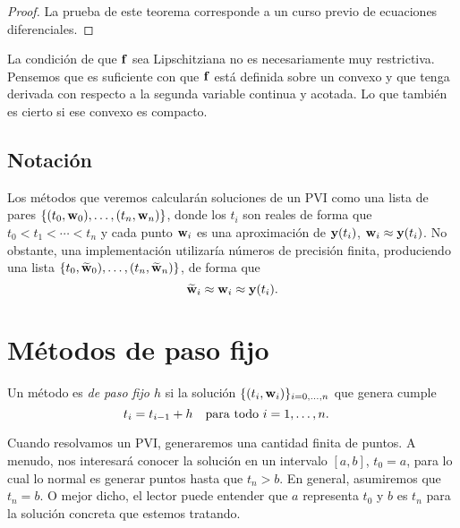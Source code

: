 \begin{proof}
    La prueba de este teorema corresponde a
    un curso previo de ecuaciones diferenciales.
\end{proof}

\begin{remark}
    La condición de que $\vb{f}$ sea Lipschitziana no es necesariamente
    muy restrictiva.
    Pensemos que es suficiente con que $\vb{f}$ está definida sobre un convexo y
    que tenga derivada con respecto a la segunda variable continua y acotada.
    Lo que también es cierto si ese convexo es compacto.
\end{remark}

\subsection{Notación}

Los métodos que veremos calcularán soluciones de un PVI
como una lista de pares $\{(t_0, \vb{w}_0), \ldots, (t_n, \vb{w}_n)\}$,
donde los $t_i$ son reales de forma que $t_0 < t_1 < \cdots < t_n$
y cada punto $\vb{w}_i$ es una aproximación de $\vb{y}(t_i)$,
$\vb{w}_i \approx \vb{y}(t_i)$.
No obstante, una implementación utilizaría números de precisión finita,
produciendo una lista $\{t_0, \vb{\widetilde{w}}_0), \ldots, (t_n, \vb{\widetilde{w}}_n)\}$,
de forma que
\begin{equation*}
    \vb{\widetilde{w}}_i \approx \vb{w}_i \approx \vb{y}(t_i).
\end{equation*}

\section{Métodos de paso fijo}

\begin{definition}
    Un método es \emph{de paso fijo $h$} si la solución
    $\{(t_i, \vb{w}_i)\}_{i = 0,\ldots,n}$ que genera cumple
    \begin{equation*}
        t_i = t_{i-1} + h \qq{para todo $i = 1,\ldots,n$.}
    \end{equation*}
\end{definition}

Cuando resolvamos un PVI, generaremos una cantidad finita de puntos.
A menudo, nos interesará conocer la solución en un intervalo $[a, b]$,
$t_0 = a$,
para lo cual lo normal es generar puntos hasta que $t_n > b$.
En general, asumiremos que $t_n = b$.
O mejor dicho, el lector puede entender que $a$ representa $t_0$
y $b$ es $t_n$ para la solución concreta que estemos tratando.

